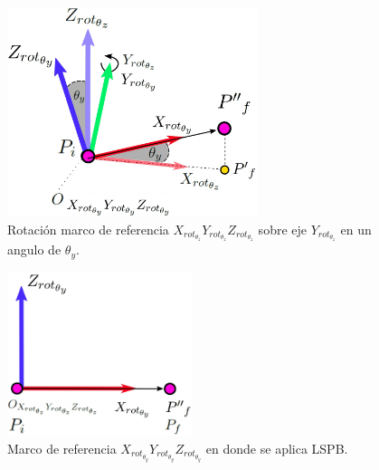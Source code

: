                  \begin{figure}[htb]
                \centering
                \includegraphics[width=0.65\textwidth]{Main/Chapter6/Images6/DIBUJO533.jpg}
                \caption{Rotación marco de referencia $X_{rot_{\theta_z}}Y_{rot_{\theta_z}}Z_{rot_{\theta_z}}$ sobre eje $Y_{rot_{\theta_z}}$ en un angulo de $\theta_y$.}
        \end{figure}
        
                \begin{figure}[htb]
                \centering
                \includegraphics[width=0.48\textwidth]{Main/Chapter6/Images6/DIBUJO534.jpg}
                \caption{Marco de referencia $X_{rot_{\theta_y}}Y_{rot_{\theta_y}}Z_{rot_{\theta_y}}$ en donde se aplica LSPB.}
        \end{figure}


    \newpage

